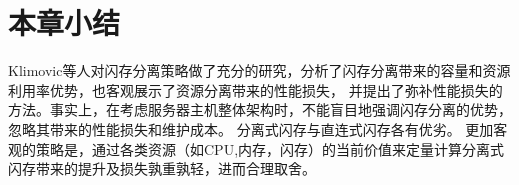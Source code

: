
\section{本章小结}

Klimovic等人\cite{klimovic2016flash}对闪存分离策略做了充分的研究，分析了闪存分离带来的容量和资源利用率优势，也客观展示了资源分离带来的性能损失，
并提出了弥补性能损失的方法。事实上，在考虑服务器主机整体架构时，不能盲目地强调闪存分离的优势，忽略其带来的性能损失和维护成本。
分离式闪存与直连式闪存各有优劣。
更加客观的策略是，通过各类资源（如CPU,内存，闪存）的当前价值来定量计算分离式闪存带来的提升及损失孰重孰轻，进而合理取舍。















